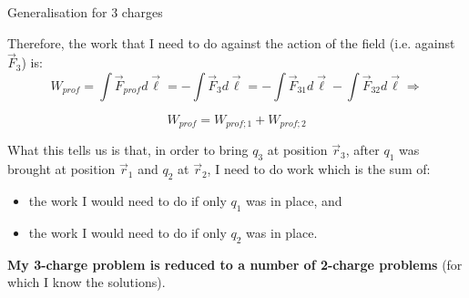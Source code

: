 %
%
%

\begin{frame}{Generalisation for 3 charges}

\vspace{0.2cm}
Therefore, the work that I need to do against the action of the field (i.e. against $\vec{F}_{3}$) is:
\begin{equation*}
  W_{prof} = \int \vec{F}_{prof} d\vec{\ell}
           = - \int \vec{F}_{3} d\vec{\ell}
           = - \int \vec{F}_{31} d\vec{\ell} - \int \vec{F}_{32} d\vec{\ell} \Rightarrow
\end{equation*}

\begin{equation*}
  W_{prof} = W_{prof;1} + W_{prof;2}
\end{equation*}

\vspace{0.3cm}
What this tells us is that, in order to bring $q_3$ at position $\vec{r}_3$,
after $q_1$ was brought at position $\vec{r}_1$ and $q_2$ at $\vec{r}_2$,
I need to do work which is the sum of:\\
\vspace{0.1cm}
\begin{itemize}
  \item the work I would need to do if only $q_1$ was in place, and
  \item the work I would need to do if only $q_2$ was in place.
\end{itemize}

{\bf My 3-charge problem is reduced to a number of 2-charge problems} (for which I know the solutions).

\end{frame}


%
%
%

